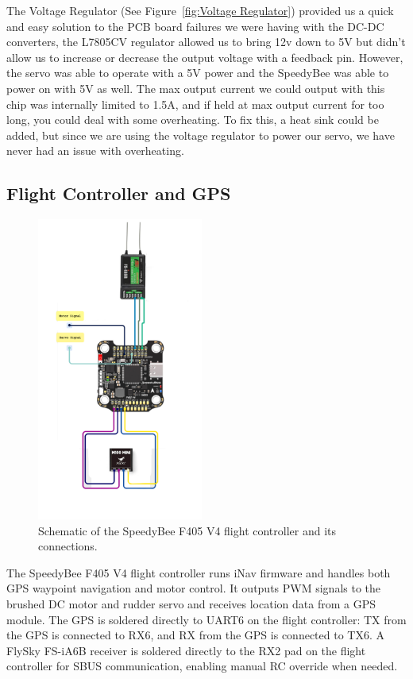The Voltage Regulator (See Figure~\ref{fig:Voltage Regulator}) provided us a quick and easy solution to the PCB board failures we were having with the DC-DC converters, the L7805CV regulator allowed us to bring 12v down to 5V but didn't allow us to increase or decrease the output voltage with a feedback pin. However, the servo was able to operate with a 5V power and the SpeedyBee was able to power on with 5V as well. The max output current we could output with this chip was internally limited to 1.5A, and if held at max output current for too long, you could deal with some overheating. To fix this, a heat sink could be added, but since we are using the voltage regulator to power our servo, we have never had an issue with overheating.

\subsection{Flight Controller and GPS}
\begin{figure}[H]
    \centering
    \includegraphics[height=10cm]{speedybee.png}
    \caption{Schematic of the SpeedyBee F405 V4 flight controller and its connections.}
    \label{fig:Speedybee}
\end{figure}

The SpeedyBee F405 V4 flight controller runs iNav firmware and handles both GPS waypoint navigation and motor control. It outputs PWM signals to the brushed DC motor and rudder servo and receives location data from a GPS module. The GPS is soldered directly to UART6 on the flight controller: TX from the GPS is connected to RX6, and RX from the GPS is connected to TX6. A FlySky FS-iA6B receiver is soldered directly to the RX2 pad on the flight controller for SBUS communication, enabling manual RC override when needed.

